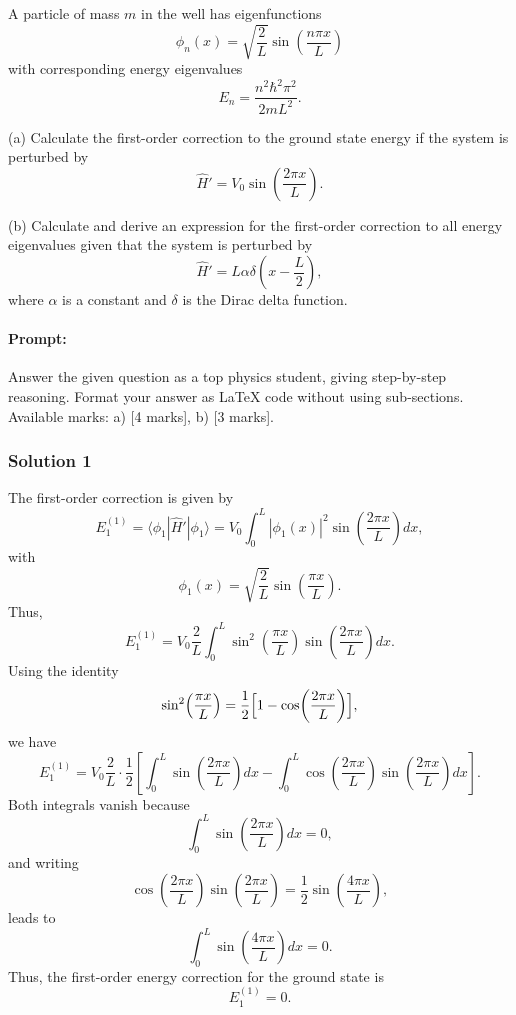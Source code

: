 \documentclass{article}
\begin{document}
A particle of mass \(m\) in the well has eigenfunctions
\[
\phi_n(x) = \sqrt{\frac{2}{L}} \sin\left(\frac{n \pi x}{L}\right)
\]
with corresponding energy eigenvalues
\[
E_n = \frac{n^2 \hbar^2 \pi^2}{2mL^2}.
\]

(a) Calculate the first-order correction to the ground state energy if the system is perturbed by
\[
\hat{H}' = V_0 \sin\left(\frac{2\pi x}{L}\right).
\]

(b) Calculate and derive an expression for the first-order correction to all energy eigenvalues given that the system is perturbed by
\[
\hat{H}' = L \alpha \delta\left(x - \frac{L}{2}\right),
\]
where \(\alpha\) is a constant and \(\delta\) is the Dirac delta function.

\paragraph{Prompt: \\} 
Answer the given question as a top physics student, giving step-by-step reasoning. Format your answer as LaTeX code without using sub-sections. Available marks: a) [4 marks], b) [3 marks].


\subsubsection{Solution 1}
The first-order correction is given by
\[
E_1^{(1)} = \langle \phi_1 | \hat{H}' | \phi_1 \rangle = V_0 \int_0^L |\phi_1(x)|^2 \sin\!\left(\frac{2\pi x}{L}\right) dx,
\]
with
\[
\phi_1(x) = \sqrt{\frac{2}{L}} \sin\!\left(\frac{\pi x}{L}\right).
\]
Thus,
\[
E_1^{(1)} = V_0 \frac{2}{L} \int_0^L \sin^2\!\left(\frac{\pi x}{L}\right) \sin\!\left(\frac{2\pi x}{L}\right) dx.
\]
Using the identity
\[
\sin^2\!\left(\frac{\pi x}{L}\right) = \frac{1}{2}\Bigl[1 - \cos\!\left(\frac{2\pi x}{L}\right)\Bigr],
\]
we have
\[
E_1^{(1)} = V_0 \frac{2}{L} \cdot \frac{1}{2} \left[ \int_0^L \sin\!\left(\frac{2\pi x}{L}\right)dx - \int_0^L \cos\!\left(\frac{2\pi x}{L}\right) \sin\!\left(\frac{2\pi x}{L}\right)dx \right].
\]
Both integrals vanish because
\[
\int_0^L \sin\!\left(\frac{2\pi x}{L}\right)dx = 0,
\]
and writing
\[
\cos\!\left(\frac{2\pi x}{L}\right) \sin\!\left(\frac{2\pi x}{L}\right) = \frac{1}{2}\sin\!\left(\frac{4\pi x}{L}\right),
\]
leads to
\[
\int_0^L \sin\!\left(\frac{4\pi x}{L}\right)dx = 0.
\]
Thus, the first-order energy correction for the ground state is
\[
E_1^{(1)} = 0.
\]
\end{document}

